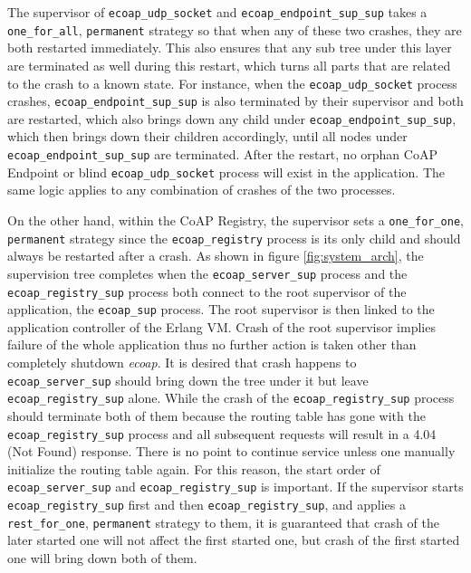The supervisor of \verb|ecoap_udp_socket| and \verb|ecoap_endpoint_sup_sup| takes a \verb|one_for_all|, \verb|permanent| strategy so that when any of these two crashes, they are both restarted immediately. This also ensures that any sub tree under this layer are terminated as well during this restart, which turns all parts that are related to the crash to a known state. For instance, when the \verb|ecoap_udp_socket| process crashes, \verb|ecoap_endpoint_sup_sup| is also terminated by their supervisor and both are restarted, which also brings down any child under \verb|ecoap_endpoint_sup_sup|, which then brings down their children accordingly, until all nodes under \verb|ecoap_endpoint_sup_sup| are terminated. After the restart, no orphan CoAP Endpoint or blind \verb|ecoap_udp_socket| process will exist in the application. The same logic applies to any combination of crashes of the two processes.

On the other hand, within the CoAP Registry, the supervisor sets a \verb|one_for_one|, \verb|permanent| strategy since the \verb|ecoap_registry| process is its only child and should always be restarted after a crash. As shown in figure \ref{fig:system_arch}, the supervision tree completes when the \verb|ecoap_server_sup| process and the \verb|ecoap_registry_sup| process both connect to the root supervisor of the application, the \verb|ecoap_sup| process. The root supervisor is then linked to the application controller of the Erlang VM. Crash of the root supervisor implies failure of the whole application thus no further action is taken other than completely shutdown \textit{ecoap}. It is desired that crash happens to \verb|ecoap_server_sup| should bring down the tree under it but leave \verb|ecoap_registry_sup| alone. While the crash of the \verb|ecoap_registry_sup| process should terminate both of them because the routing table has gone with the \verb|ecoap_registry_sup| process and all subsequent requests will result in a 4.04 (Not Found) response. There is no point to continue service unless one manually initialize the routing table again. For this reason, the start order of \verb|ecoap_server_sup| and \verb|ecoap_registry_sup| is important. If the supervisor starts \verb|ecoap_registry_sup| first and then \verb|ecoap_registry_sup|, and applies a \verb|rest_for_one|, \verb|permanent| strategy to them, it is guaranteed that crash of the later started one will not affect the first started one, but crash of the first started one will bring down both of them. 






